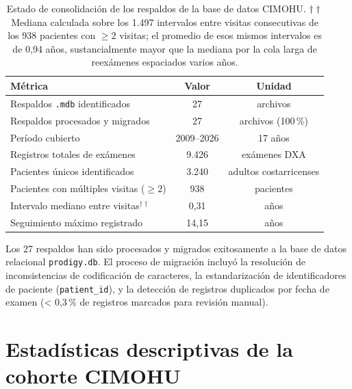 \documentclass[../tesis.tex]{subfiles}
\begin{document}
\begin{table}[h]
\centering
\caption[Estado de consolidación de los respaldos de la base de datos CIMOHU]{Estado de consolidación de los respaldos de la base de datos CIMOHU.
$\dagger\dagger$ Mediana calculada sobre los 1.497 intervalos entre visitas consecutivas de los 938 pacientes con $\geq 2$ visitas; el promedio de esos mismos intervalos es de 0{,}94 años, sustancialmente mayor que la mediana por la cola larga de reexámenes espaciados varios años.}
\label{tab:etl_status}
\begin{tabular}{lcc}
\toprule
\textbf{Métrica} & \textbf{Valor} & \textbf{Unidad} \\
\midrule
Respaldos \texttt{.mdb} identificados    & 27            & archivos \\
Respaldos procesados y migrados           & 27            & archivos (100\,\%) \\
Período cubierto                          & 2009--2026    & 17 años \\
Registros totales de exámenes             & 9.426         & exámenes DXA \\
Pacientes únicos identificados            & 3.240         & adultos costarricenses \\
Pacientes con múltiples visitas ($\geq 2$)& 938           & pacientes \\
Intervalo mediano entre visitas$^{\dagger\dagger}$ & 0{,}31 & años \\
Seguimiento máximo registrado             & 14{,}15       & años \\
\bottomrule
\end{tabular}
\end{table}

Los 27 respaldos han sido procesados y migrados exitosamente a la base de datos relacional \texttt{prodigy.db}. El proceso de migración incluyó la resolución de inconsistencias de codificación de caracteres, la estandarización de identificadores de paciente (\texttt{patient\_id}), y la detección de registros duplicados por fecha de examen (< 0{,}3\,\% de registros marcados para revisión manual).

\section{Estadísticas descriptivas de la cohorte CIMOHU}
\label{sec:resultados_descriptivas}
\end{document}
